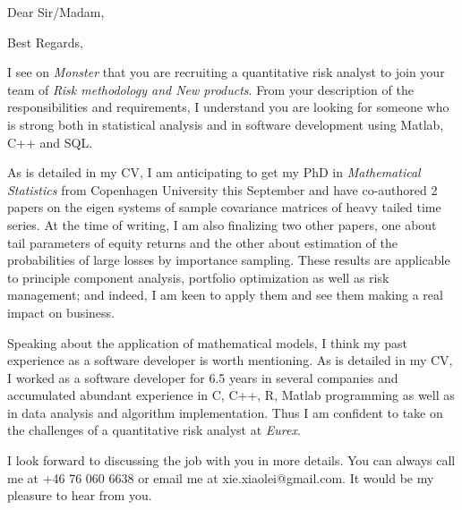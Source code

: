 \documentclass[10pt,a4paper, gentium]{moderncv}        %
\begin{document}
\date{\today}
\opening{Dear Sir/Madam,}
\closing{Best Regards,}
\makelettertitle

I see on {\em Monster} that you are recruiting a quantitative risk
analyst to join your team of {\em Risk methodology and New products}.
From your description of the responsibilities and requirements, I
understand you are looking for someone who is strong both in
statistical analysis and in software development using Matlab, C++ and
SQL.

As is detailed in my CV, I am anticipating to get my PhD in {\em
  Mathematical Statistics} from Copenhagen University this September
and have co-authored 2 papers on the eigen systems of sample
covariance matrices of heavy tailed time series. At the time of
writing, I am also finalizing two other papers, one about tail
parameters of equity returns and the other about estimation of
the probabilities of large losses by importance sampling.
These results are applicable to principle component analysis,
portfolio optimization as well as risk management; and indeed, I am
keen to apply them and see them making a real impact on business.

Speaking about the application of mathematical models, I think my past
experience as a software developer is worth mentioning. As is detailed
in my CV, I worked as a software developer for 6.5 years in several
companies and accumulated abundant experience in C, C++, R, Matlab
programming as well as in data analysis and algorithm implementation.
Thus I am confident to take on the challenges of a quantitative risk
analyst at {\em Eurex}.

I look forward to discussing the job with you in more
details. You can always call me at +46 76 060 6638 or email me at
xie.xiaolei@gmail.com. It would be my pleasure to hear from you.

\makeletterclosing
\end{document}
